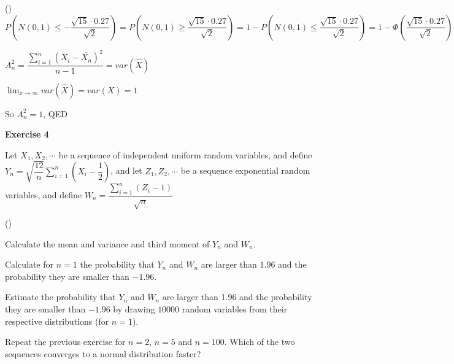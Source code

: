 \documentclass[12pt]{article}
\begin{document}
\begin{list}{()~}{}
$P\left(N\left(0, 1\right)\leq -\dfrac{\sqrt{15}\cdot 0.27}{\sqrt{2}}\right)=P\left(N\left(0, 1\right)\geq \dfrac{\sqrt{15}\cdot 0.27}{\sqrt{2}}\right) = 1 - P\left(N\left(0, 1\right)\leq \dfrac{\sqrt{15}\cdot 0.27}{\sqrt{2}}\right) = 1-\Phi\left(\dfrac{\sqrt{15}\cdot 0.27}{\sqrt{2}}\right)=1-\Phi\left(0.74\right) = 1-0.77 = 0.23$

\item $A_n^2 = \dfrac{\sum_{i = 1}^n\left(X_i-\overline{X_n}\right)^2}{n-1} = var(\hat{X})$

$\lim_{x \to \infty} var(\hat{X}) = var(X) = 1$

So $A_n^2 = 1$,  QED
\end{list}

\bigskip

\textbf{Exercise 4}

Let $X_1, X_2,\cdots$ be a sequence of independent uniform random variables, and define $Y_n=\sqrt{\dfrac{12}{n}}\sum_{i=1}^n\left(X_i-\dfrac{1}{2}\right)$, and let $Z_1, Z_2,\cdots$ be a sequence exponential random variables, and define $W_n = \dfrac{\sum_{i=1}^n\left(Z_i-1\right)}{\sqrt{n}}$

\begin{list}{()~}{}
\item Calculate the mean and variance and third moment of $Y_n$ and $W_n$.
\item Calculate for $n=1$ the probability that $Y_n$ and $W_n$ are larger
than $1.96$ and the probability they are smaller than $-1.96$.
\item Estimate the probability that $Y_n$ and $W_n$ are larger than 1.96 and the probability they are smaller than $-1.96$ by drawing $10000$ random variables from their respective distributions (for $n = 1$).
\item Repeat the previous exercise for $n=2$, $n=5$ and $n=100$. Which of the two sequences converges to a normal distribution faster?
\end{list}
\medskip
\end{document}
